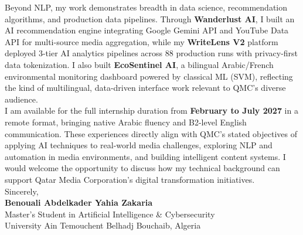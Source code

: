 \documentclass[11pt, letterpaper]{article}
\begin{document}
Beyond NLP, my work demonstrates breadth in data science, recommendation algorithms, and production data pipelines. Through \textbf{Wanderlust AI}, I built an AI recommendation engine integrating Google Gemini API and YouTube Data API for multi-source media aggregation, while my \textbf{WriteLens V2} platform deployed 3-tier AI analytics pipelines across 88 production runs with privacy-first data tokenization. I also built \textbf{EcoSentinel AI}, a bilingual Arabic/French environmental monitoring dashboard powered by classical ML (SVM), reflecting the kind of multilingual, data-driven interface work relevant to QMC's diverse audience.\\[10pt]

I am available for the full internship duration from \textbf{February to July 2027} in a remote format, bringing native Arabic fluency and B2-level English communication. These experiences directly align with QMC's stated objectives of applying AI techniques to real-world media challenges, exploring NLP and automation in media environments, and building intelligent content systems. I would welcome the opportunity to discuss how my technical background can support Qatar Media Corporation's digital transformation initiatives.\\[14pt]

\noindent Sincerely,\\[18pt]

\noindent \textbf{Benouali Abdelkader Yahia Zakaria}\\
\noindent Master's Student in Artificial Intelligence \& Cybersecurity\\
\noindent University Ain Temouchent Belhadj Bouchaib, Algeria
\end{document}
